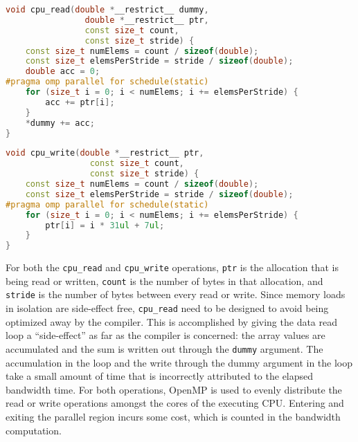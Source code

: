 \begin{lstlisting}[language=C++, caption=CPU-CPU Read Function, label=lst:explicit-cpu-cpu-cpuread]
void cpu_read(double *__restrict__ dummy,
                double *__restrict__ ptr,
                const size_t count,
                const size_t stride) {
    const size_t numElems = count / sizeof(double);
    const size_t elemsPerStride = stride / sizeof(double);
    double acc = 0;
#pragma omp parallel for schedule(static)
    for (size_t i = 0; i < numElems; i += elemsPerStride) {
        acc += ptr[i];
    }
    *dummy += acc;
}
\end{lstlisting}


\begin{lstlisting}[language=C++, caption=CPU-CPU Write Function, label=lst:explicit-cpu-cpu-cpuwrite]
void cpu_write(double *__restrict__ ptr, 
                 const size_t count, 
                 const size_t stride) {
    const size_t numElems = count / sizeof(double);
    const size_t elemsPerStride = stride / sizeof(double);
#pragma omp parallel for schedule(static)
    for (size_t i = 0; i < numElems; i += elemsPerStride) {
        ptr[i] = i * 31ul + 7ul;
    }
}
\end{lstlisting}

For both the \texttt{cpu\_read} and \texttt{cpu\_write} operations, \texttt{ptr} is the allocation that is being read or written,
\texttt{count} is the number of bytes in that allocation, and \texttt{stride} is the number of bytes between every read or write.
Since memory loads in isolation are side-effect free, \texttt{cpu\_read} need to be designed to avoid being optimized away by the compiler.
This is accomplished by giving the data read loop a ``side-effect'' as far as the compiler is concerned: the array values are accumulated and the sum is written out through the \texttt{dummy} argument.
The accumulation in the loop and the write through the dummy argument in the loop take a small amount of time that is incorrectly attributed to the elapsed bandwidth time.
For both operations, OpenMP is used to evenly distribute the read or write operations amongst the cores of the executing CPU.
Entering and exiting the parallel region incurs some cost, which is counted in the bandwidth computation.

